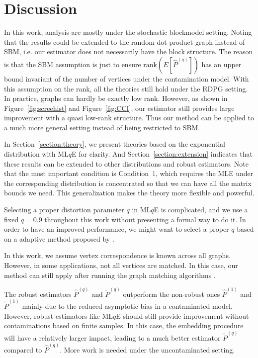 \documentclass[a4paper]{article}
\renewcommand{\hat}{\widehat}
\begin{document}
\section{Discussion}

In this work, analysis are mostly under the stochastic blockmodel setting. Noting that the results could be extended to the random dot product graph instead of SBM, i.e. our estimator does not necessarily have the block structure. The reason is that the SBM assumption is just to ensure $\mathrm{rank}(E[\hat{P}^{(q)}])$ has an upper bound invariant of the number of vertices under the contamination model. With this assumption on the rank, all the theories still hold under the RDPG setting. In practice, graphs can hardly be exactly low rank. However, as shown in Figure~\ref{fig:screehist} and Figure~\ref{fig:CCI}, our estimator still provides large improvement with a quasi low-rank structure. Thus our method can be applied to a much more general setting instead of being restricted to SBM.

In Section~\ref{section:theory}, we present theories based on the exponential distribution with ML$q$E for clarity. And Section~\ref{section:extension} indicates that these results can be extended to other distributions and robust estimators. Note that the most important condition is Condition~1, which requires the MLE under the corresponding distribution is concentrated so that we can have all the matrix bounds we need. This generalization makes the theory more flexible and powerful.

Selecting a proper distortion parameter $q$ in ML$q$E is complicated, and we use a fixed $q = 0.9$ throughout this work without presenting a formal way to do it. In order to have an improved performance, we might want to select a proper $q$ based on a adaptive method proposed by \citet{qin2013robust}.

In this work, we assume vertex correspondence is known across all graphs. However, in some applications, not all vertices are matched. In this case, our method can still apply after running the graph matching algorithms \citep{lyzinski2016graph, lyzinski2015spectral, lyzinski2014seeded}.

The robust estimators $\hat{P}^{(q)}$ and $\widetilde{P}^{(q)}$ outperform the non-robust ones $\hat{P}^{(1)}$ and $\widetilde{P}^{(1)}$ mainly due to the reduced asymptotic bias in a contaminated model. However, robust estimators like ML$q$E should still provide improvement without contaminations based on finite samples. In this case, the embedding procedure will have a relatively larger impact, leading to a much better estimator $\widetilde{P}^{(q)}$ compared to $\hat{P}^{(q)}$. More work is needed under the uncontaminated setting.
\end{document}

